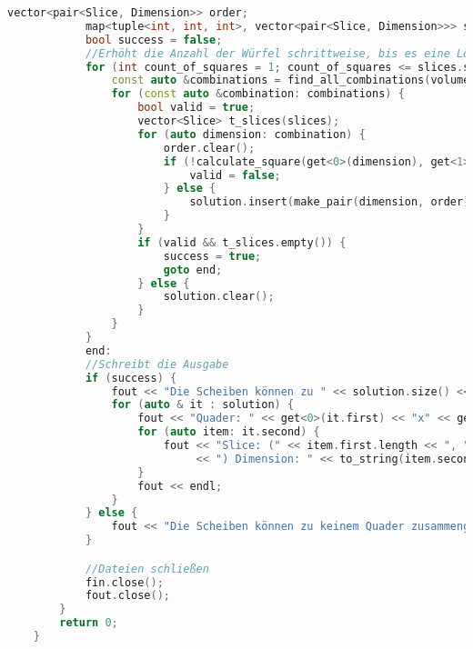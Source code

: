 \documentclass[a4paper,10pt,ngerman]{scrartcl}
\begin{document}
\begin{lstlisting}[frame=single,language=C++,title=Methode main,breaklines=true,label={lst:code_main_extended}]
            vector<pair<Slice, Dimension>> order;
            map<tuple<int, int, int>, vector<pair<Slice, Dimension>>> solution;
            bool success = false;
            //Erhöht die Anzahl der Würfel schrittweise, bis es eine Lösung gibt
            for (int count_of_squares = 1; count_of_squares <= slices.size(); count_of_squares++) {
                const auto &combinations = find_all_combinations(volume, count_of_squares, slices);
                for (const auto &combination: combinations) {
                    bool valid = true;
                    vector<Slice> t_slices(slices);
                    for (auto dimension: combination) {
                        order.clear();
                        if (!calculate_square(get<0>(dimension), get<1>(dimension), get<2>(dimension), order, t_slices)) {
                            valid = false;
                        } else {
                            solution.insert(make_pair(dimension, order));
                        }
                    }
                    if (valid && t_slices.empty()) {
                        success = true;
                        goto end;
                    } else {
                        solution.clear();
                    }
                }
            }
            end:
            //Schreibt die Ausgabe
            if (success) {
                fout << "Die Scheiben können zu " << solution.size() << " Quader(n) zusammengesetzt werden." << endl;
                for (auto & it : solution) {
                    fout << "Quader: " << get<0>(it.first) << "x" << get<1>(it.first) << "x" << get<2>(it.first) << endl;
                    for (auto item: it.second) {
                        fout << "Slice: (" << item.first.length << ", " << item.first.height
                             << ") Dimension: " << to_string(item.second) << endl;
                    }
                    fout << endl;
                }
            } else {
                fout << "Die Scheiben können zu keinem Quader zusammengesetzt werden." << endl;
            }

            //Dateien schließen
            fin.close();
            fout.close();
        }
        return 0;
    }
    \end{lstlisting}
\end{document}
